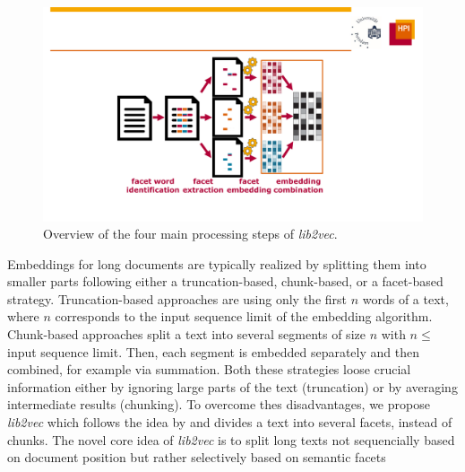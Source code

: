 \documentclass[11pt]{article}
\begin{document}
\begin{figure}
	\centering
	\includegraphics[width=0.99\linewidth]{figures/approach_overview.pdf}
	\caption{Overview of the four main processing steps of \emph{lib2vec}.}
   \label{fig:overview}
\end{figure}

Embeddings for long documents are typically realized by splitting them into smaller parts following either a truncation-based, chunk-based, or a facet-based strategy.
Truncation-based approaches are using only the first $n$ words of a text, where $n$ corresponds to the input sequence limit of the embedding algorithm.
Chunk-based approaches split a text into several segments of size $n$ with $n\leq$ input sequence limit.
Then, each segment is embedded separately and then combined, for example via summation.
Both these strategies loose crucial information either by ignoring large parts of the text (truncation) or by averaging intermediate results (chunking).
To overcome thes disadvantages, we propose \emph{lib2vec} which follows the idea by \citet{risch_book_2018} and divides a text into several facets, instead of chunks.
The novel core idea of \emph{lib2vec} is to split long texts not sequencially based on document position but rather selectively based on semantic facets
\end{document}
